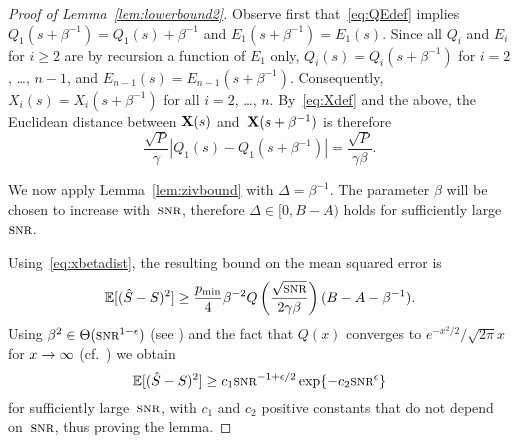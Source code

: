 \begin{proof}[Proof of Lemma~\ref{lem:lowerbound2}]
  Observe first that~\eqref{eq:QEdef} implies $Q_1(s + \beta^{-1}) = Q_1(s) +
  \beta^{-1}$ and $E_1(s + \beta^{-1}) = E_1(s)$. Since all $Q_i$ and $E_i$ for
  $i \ge 2$ are by recursion a function of $E_1$ only, $Q_i(s) = Q_i(s +
  \beta^{-1})$ for $i = 2$, \dots, $n-1$, and $E_{n-1}(s) = E_{n-1}(s +
  \beta^{-1})$. Consequently,  $X_i(s) = X_i(s + \beta^{-1})$ for all $i =
  2$, \dots, $n$. By~\eqref{eq:Xdef} and the above, the Euclidean distance
  between $\mathbf{X}(s)$ and~$\mathbf{X}(s+\beta^{-1})$ is therefore
  \begin{equation}
    \label{eq:xbetadist}
    \frac{\sqrt P}{\gamma} |Q_1(s) - Q_1(s+\beta^{-1})| 
    = \frac{\sqrt P}{\gamma\beta}.
  \end{equation}

  We now apply Lemma~\ref{lem:zivbound} with $\Delta = \beta^{-1}$. The
  parameter $\beta$ will be chosen to increase with~$\snr$, therefore $\Delta
  \in [0, B-A)$ holds for sufficiently large~$\snr$.

  Using~\eqref{eq:xbetadist}, the resulting bound on the mean squared error is
  \begin{equation*}
    \mse \ge \frac{\pmin}{4} \beta^{-2}
    Q\left (\frac{\sqrt{\snr}}{2\gamma\beta}  \right) (B-A-\beta^{-1}
    ).
  \end{equation*}
  Using $\beta^2 \in \Theta(\snr^{1-\e})$ (see ) and the
  fact that $Q(x)$ converges to $e^{-x^2/2}/\sqrt{2\pi}x$ for $x \rightarrow \infty$
  (cf.~\cite[\Spg~26.2.12]{AbramowitzS1964}) we obtain
  \begin{equation*}
    \mse \ge c_1 \snr^{-1 + \e/2} \exp\{-c_2\snr^\e\}
  \end{equation*}
  for sufficiently large~$\snr$, with $c_1$ and $c_2$ positive constants that do
  not depend on~$\snr$, thus proving the lemma.
\end{proof}

